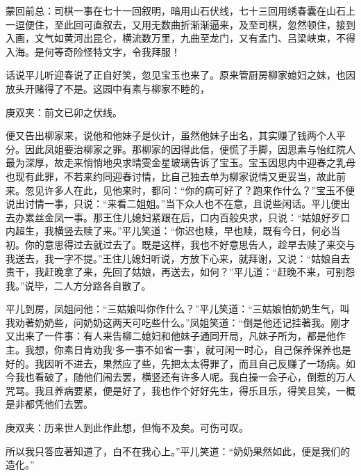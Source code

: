 

\begin{parag}
    \begin{note}蒙回前总：司棋一事在七十一回叙明，暗用山石伏线，七十三回用绣春囊在山石上一逗便住，至此回可直叙去，又用无数曲折渐渐逼来，及至司棋，忽然顿住，接到入画，文气如黄河出昆仑，横流数万里，九曲至龙门，又有孟门、吕梁峡束，不得入海。是何等奇险怪特文字，令我拜服！\end{note}
\end{parag}


\begin{parag}
    话说平儿听迎春说了正自好笑，忽见宝玉也来了。原来管厨房柳家媳妇之妹，也因放头开赌得了不是。这园中有素与柳家不睦的，\begin{note}庚双夹：前文已卯之伏线。\end{note}便又告出柳家来，说他和他妹子是伙计，虽然他妹子出名，其实赚了钱两个人平分。因此凤姐要治柳家之罪。那柳家的因得此信，便慌了手脚，因思素与怡红院人最为深厚，故走来悄悄地央求晴雯金星玻璃告诉了宝玉。宝玉因思内中迎春之乳母也现有此罪，不若来约同迎春讨情，比自己独去单为柳家说情又更妥当，故此前来。忽见许多人在此，见他来时，都问：“你的病可好了？跑来作什么？”宝玉不便说出讨情一事，只说：“来看二姐姐。”当下众人也不在意，且说些闲话。平儿便出去办累丝金凤一事。那王住儿媳妇紧跟在后，口内百般央求，只说：“姑娘好歹口内超生，我横竖去赎了来。”平儿笑道：“你迟也赎，早也赎，既有今日，何必当初。你的意思得过去就过去了。既是这样，我也不好意思告人，趁早去赎了来交与我送去，我一字不提。”王住儿媳妇听说，方放下心来，就拜谢，又说：“姑娘自去贵干，我赶晚拿了来，先回了姑娘，再送去，如何？”平儿道：“赶晚不来，可别怨我。”说毕，二人方分路各自散了。
\end{parag}


\begin{parag}
    平儿到房，凤姐问他：“三姑娘叫你作什么？”平儿笑道：“三姑娘怕奶奶生气，叫我劝著奶奶些，问奶奶这两天可吃些什么。”凤姐笑道：“倒是他还记挂著我。刚才又出来了一件事：有人来告柳二媳妇和他妹子通同开局，凡妹子所为，都是他作主。我想，你素日肯劝我‘多一事不如省一事’，就可闲一时心，自己保养保养也是好的。我因听不进去，果然应了些，先把太太得罪了，而且自己反赚了一场病。如今我也看破了，随他们闹去罢，横竖还有许多人呢。我白操一会子心，倒惹的万人咒骂。我且养病要紧，便是好了，我也作个好好先生，得乐且乐，得笑且笑，一概是非都凭他们去罢。\begin{note}庚双夹：历来世人到此作此想，但悔不及矣。可伤可叹。\end{note}所以我只答应著知道了，白不在我心上。”平儿笑道：“奶奶果然如此，便是我们的造化。”
\end{parag}



